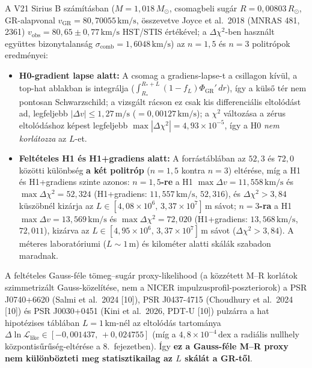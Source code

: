 \documentclass[10pt,a4paper]{article}
\begin{document}
\par
A V21 Sirius B sz\'am\'it\'asban ($M = 1{,}018\,M_\odot$, csomagbeli sug\'ar $R = 0{,}00803\,R_\odot$, GR-alapvonal $v_{\text{GR}} = 80{,}70055\,\text{km/s}$, \"osszevetve Joyce et al.\ 2018 (MNRAS 481, 2361) $v_{\text{obs}} = 80{,}65 \pm 0{,}77\,\text{km/s}$ HST/STIS \'ert\'ek\'evel; a $\Delta\chi^2$-ben haszn\'alt egy\"uttes bizonytalans\'ag $\sigma_{\text{comb}} = 1{,}6048\,\text{km/s}$) az $n=1{,}5$ \'es $n=3$ politr\'opok eredm\'enyei:
\begin{itemize}\setlength{\itemsep}{1.5pt}\setlength{\parskip}{0pt}\setlength{\topsep}{1pt}
  \item \textbf{H0-gradient lapse alatt:} A csomag a gradiens-lapse-t a csillagon k\'iv\"ul, a top-hat ablakban is integr\'alja ($\int_{R_*}^{R_*+L}(1-f_L)\Phi_{\text{GR}}'\,dr$), \'igy a k\"uls\H{o} t\'er nem pontosan Schwarzschild; a vizsg\'alt r\'acson ez csak kis differenci\'alis eltol\'od\'ast ad, legfeljebb \textbf{$|\Delta v| \le 1{,}27\,\text{m/s}$} ($= 0{,}00127\,\text{km/s}$); a $\chi^2$ v\'altoz\'asa a z\'erus eltol\'od\'ashoz k\'epest legfeljebb $\max|\Delta\chi^2| = 4{,}93\times 10^{-5}$, \'igy a H0 \emph{nem korl\'atozza} az $L$-et.
  \item \textbf{Felt\'eteles H1 \'es H1+gradiens alatt:} A forr\'ast\'abl\'aban az $52{,}3$ \'es $72{,}0$ k\"oz\"otti k\"ul\"onbs\'eg \textbf{a k\'et politr\'op} ($n=1{,}5$ kontra $n=3$) elt\'er\'ese, m\'ig a H1 \'es H1+gradiens szinte azonos: \textbf{$n=1{,}5$-re} a H1 $\max\Delta v = 11{,}558\,\text{km/s}$ \'es $\max\Delta\chi^2 = 52{,}324$ (H1+gradiens: $11{,}557\,\text{km/s}$, $52{,}316$), \'es $\Delta\chi^2 > 3{,}84$ k\"usz\"obn\'el kiz\'arja az \textbf{$L \in [4{,}08\times 10^6,\, 3{,}37\times 10^7]\,\text{m}$} s\'avot; \textbf{$n=3$-ra} a H1 $\max\Delta v = 13{,}569\,\text{km/s}$ \'es $\max\Delta\chi^2 = 72{,}020$ (H1+gradiens: $13{,}568\,\text{km/s}$, $72{,}011$), kiz\'arva az \textbf{$L \in [4{,}95\times 10^6,\, 3{,}37\times 10^7]\,\text{m}$} s\'avot ($\Delta\chi^2 > 3{,}84$). A m\'eteres laborat\'oriumi ($L \sim 1\,\text{m}$) \'es kilom\'eter alatti sk\'al\'ak szabadon maradnak.
\end{itemize}

\par
A felt\'eteles Gauss-f\'ele t\"omeg--sug\'ar proxy-likelihood (a k\"ozz\'etett M--R korl\'atok szimmetriz\'alt Gauss-k\"ozel\'it\'ese, nem a NICER impulzusprofil-poszteriorok) a PSR J0740+6620 (Salmi et al.\ 2024 [10]), PSR J0437-4715 (Choudhury et al.\ 2024 [10]) \'es PSR J0030+0451 (Kini et al.\ 2026, PDT-U [10]) pulz\'arra a hat hipot\'ezises t\'abl\'aban $L = 1\,\text{km}$-n\'el az eltol\'od\'as tartom\'anya \textbf{$\Delta\ln\mathcal{L}_{\text{like}} \in [-0{,}001437,\, +0{,}024755]$} (m\'ig a $4{,}8\times 10^{-4}\,\text{dex}$ a radi\'alis nullhely k\"ozpontis\H{u}r\H{u}s\'eg-elt\'er\'ese a 8.\ fejezetben). \'Igy \textbf{ez a Gauss-f\'ele M--R proxy nem k\"ul\"onb\"ozteti meg statisztikailag az $L$ sk\'al\'at a GR-t\H{o}l}.
\newpage
\end{document}
